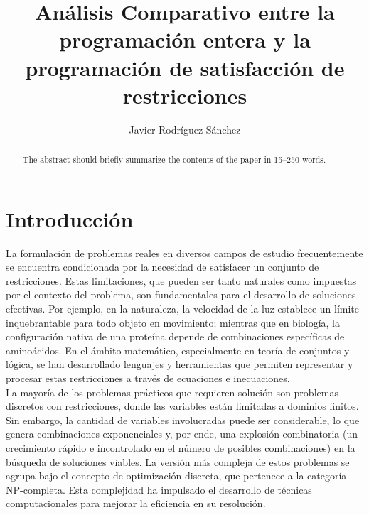 \documentclass[12pt]{report}
\begin{document}
%
\title{Análisis Comparativo entre la programación entera y la programación de satisfacción de restricciones}

%
\author{Javier Rodríguez Sánchez}

\maketitle 

\begin{abstract}
The abstract should briefly summarize the contents of the paper in
15--250 words.

\end{abstract}
%

\newpage

\tableofcontents

\newpage
\chapter{Introducción}

La formulación de problemas reales en diversos campos de estudio frecuentemente se encuentra condicionada por la necesidad de satisfacer un conjunto de restricciones. Estas limitaciones, que pueden ser tanto naturales como impuestas por el contexto del problema, son fundamentales para el desarrollo de soluciones efectivas. Por ejemplo, en la naturaleza, la velocidad de la luz establece un límite inquebrantable para todo objeto en movimiento; mientras que en biología, la configuración nativa de una proteína depende de combinaciones específicas de aminoácidos. En el ámbito matemático, especialmente en teoría de conjuntos y lógica, se han desarrollado lenguajes y herramientas que permiten representar y procesar estas restricciones a través de ecuaciones e inecuaciones. \\

La mayoría de los problemas prácticos que requieren solución son problemas discretos con restricciones, donde las variables están limitadas a dominios finitos. Sin embargo, la cantidad de variables involucradas puede ser considerable, lo que genera combinaciones exponenciales y, por ende, una explosión combinatoria (un crecimiento rápido e incontrolado en el número de posibles combinaciones) en la búsqueda de soluciones viables. La versión más compleja de estos problemas se agrupa bajo el concepto de optimización discreta, que pertenece a la categoría NP-completa. Esta complejidad ha impulsado el desarrollo de técnicas computacionales para mejorar la eficiencia en su resolución.  \\
\end{document}
